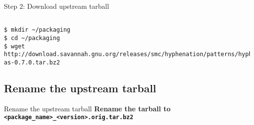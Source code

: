 \documentclass[red,10pt,a4paper]{beamer}
\begin{document}
\begin{frame}[fragile]{Step 2: Download upstream tarball}
\lstset{breaklines=true}
\begin{lstlisting}

$ mkdir ~/packaging
$ cd ~/packaging
$ wget http://download.savannah.gnu.org/releases/smc/hyphenation/patterns/hyphen-as-0.7.0.tar.bz2
    \end{lstlisting} 
\end{frame}

\subsection{Rename the upstream tarball}

\begin{frame}{Rename the upstream tarball}
\textbf{Rename the tarball to \texttt{<package\_name>\_<version>.orig.tar.bz2}}


\end{frame}
\end{document}
